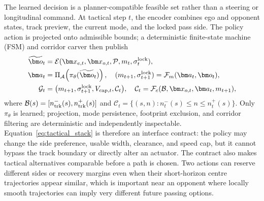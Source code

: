 The learned decision is a planner-compatible feasible set rather than a
steering or longitudinal command.  At tactical step $t$, the encoder combines
ego and opponent states, track preview, the current mode, and the locked pass
side.  The policy action is projected onto admissible bounds; a deterministic
finite-state machine (FSM) and corridor carver then publish
\begin{equation}
\begin{aligned}
\widetilde{\bm o}_t&=\mathcal E(\bm x_{e,t},\bm x_{o,t},\mathcal P,
 m_t,\sigma_t^{\rm lock}),\\
\bm a_t&=\Pi_{\mathcal A}\!\left(\pi_\theta(\widetilde{\bm o}_t)\right),
\quad (m_{t+1},\sigma_{t+1}^{\rm lock})=\mathcal F_m(\bm a_t,\bm o_t),\\
\mathcal G_t&=\bigl(m_{t+1},\sigma_{t+1}^{\rm lock},V_{{\rm cap},t},
\mathcal C_t\bigr),\quad
\mathcal C_t=\mathcal F_c(\mathcal B,\bm x_{o,t},\bm a_t,m_{t+1}),
\end{aligned}
\label{eq:tactical_stack}
\end{equation}
where $\mathcal B(s)=[n_{\rm trk}^-(s),n_{\rm trk}^+(s)]$ and
$\mathcal C_t=\{(s,n):n_t^-(s)\le n\le n_t^+(s)\}$.  Only
$\pi_\theta$ is learned; projection, mode persistence, footprint exclusion,
and corridor filtering are deterministic and independently inspectable.
Equation~\eqref{eq:tactical_stack} is therefore an interface contract: the
policy may change the side preference, usable width, clearance, and speed cap,
but it cannot bypass the track boundary or directly alter an actuator.  The
contract also makes tactical alternatives comparable before a path is chosen.
Two actions can reserve different sides or recovery margins even when their
short-horizon centre trajectories appear similar, which is important near an
opponent where locally smooth trajectories can imply very different future
passing options.

